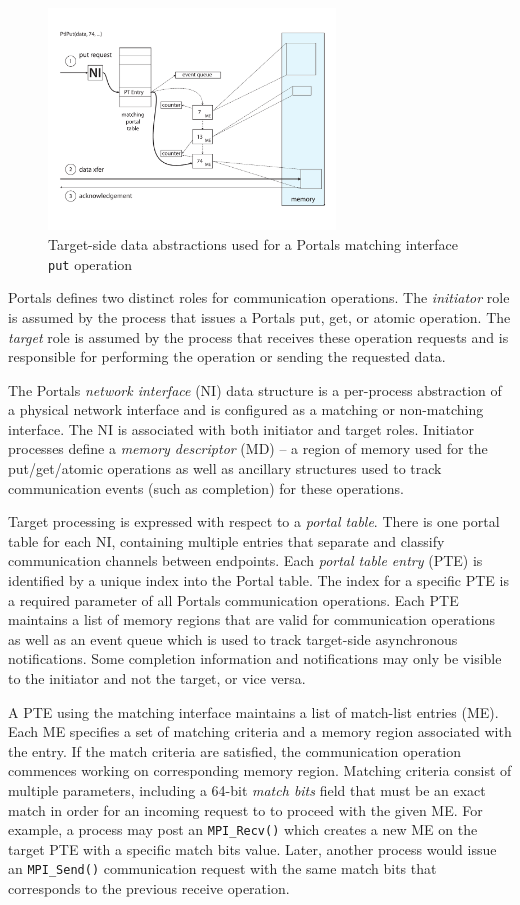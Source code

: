 \begin{figure}[ht]
  \centering
  \includegraphics[width=3in]{figs/portals_put}
  \caption{Target-side data abstractions used for a Portals matching interface {\tt put} operation}
  \label{fig:portals_put}
\end{figure}

Portals defines two distinct roles for communication operations. The {\em
  initiator} role is assumed by the process that issues a Portals put, get, or
atomic operation. The {\em target} role is assumed by the process that receives
these operation requests and is responsible for performing the operation or
sending the requested data.

The Portals {\em network interface} (NI) data structure is a per-process
abstraction of a physical network interface and is configured as a
matching or non-matching interface. The NI is associated with both
initiator and target roles. Initiator processes define a {\em memory
  descriptor} (MD) -- a region of memory used for the put/get/atomic
operations as well as ancillary structures used to track communication
events (such as completion) for these operations.

Target processing is expressed with respect to a {\em portal table}. There is
one portal table for each NI, containing multiple entries that separate and
classify communication channels between endpoints.  Each {\em portal table
  entry} (PTE) is identified by a unique index into the Portal table. The index
for a specific PTE is a required parameter of all Portals communication
operations. Each PTE maintains a list of memory regions that are valid for
communication operations as well as an event queue which is used to track
target-side asynchronous notifications.  Some completion information and
notifications may only be visible to the initiator and not the target, or vice
versa.

A PTE using the matching interface maintains a list of match-list entries (ME).
Each ME specifies a set of matching criteria and a memory region associated
with the entry. If the match criteria are satisfied, the communication
operation commences working on corresponding memory region. Matching criteria
consist of multiple parameters, including a 64-bit {\em match bits} field
that must be an exact match in order for an incoming request to to proceed
with the given ME. For example, a process may post an {\tt MPI\_Recv()} which
creates a new ME on the target PTE with a specific match bits value. Later,
another process would issue an {\tt MPI\_Send()} communication request with
the same match bits that corresponds to the previous receive operation.

